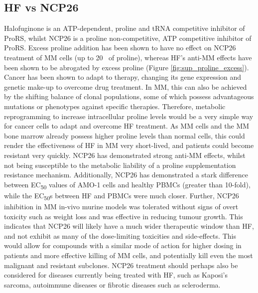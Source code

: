 \subsection{HF vs NCP26}
Halofuginone is an ATP-dependent, proline and tRNA competitive inhibitor of ProRS, whilst NCP26 is a proline non-competitive, ATP competitive inhibitor of ProRS\cite{keller2012halofuginone,adachi2017discovery,bottpreclinical2022}.
Excess proline addition has been shown to have no effect on NCP26 treatment of MM cells (up to 20\si{\milli\Molar} of proline), whereas HF's anti-MM effects have been shown to be abrogated by excess proline (Figure \ref{fig:sup_proline_excess}).
Cancer has been shown to adapt to therapy, changing its gene expression and genetic make-up to overcome drug treatment.
In MM, this can also be achieved by the shifting balance of clonal populations, some of which possess advantageous mutations or phenotypes against specific therapies.
Therefore, metabolic reprogramming to increase intracellular proline levels would be a very simple way for cancer cells to adapt and overcome HF treatment.
As MM cells and the MM bone marrow already possess higher proline levels than normal cells, this could render the effectiveness of HF in MM very short-lived, and patients could become resistant very quickly.
NCP26 has demonstrated strong anti-MM effects, whilst not being susceptible to the metabolic liability of a proline supplementation resistance mechanism.
Additionally, NCP26 has demonstrated a stark difference between EC\textsubscript{50} values of AMO-1 cells and healthy PBMCs (greater than 10-fold)\cite{bottpreclinical2022}, while the EC\textsubscript{50}s between HF and PBMCs were much closer.
Further, NCP26 inhibition in MM in-vivo murine models was tolerated without signs of overt toxicity such as weight loss and was effective in reducing tumour growth\cite{bottpreclinical2022}.
This indicates that NCP26 will likely have a much wider therapeutic window than HF, and not exhibit as many of the dose-limiting toxicities and side-effects.
This would allow for compounds with a similar mode of action for higher dosing in patients and more effective killing of MM cells, and potentially kill even the most malignant and resistant subclones.
NCP26 treatment should perhaps also be considered for diseases currently being treated with HF, such as Kaposi's sarcoma, autoimmune diseases or fibrotic diseases such as scleroderma.

